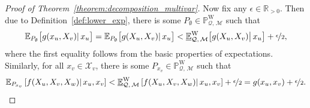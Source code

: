 \documentclass[10pt,a4paper]{paper}
\theoremstyle{definition}
\newcommand{\reals}{\mathbb{R}}
\newcommand{\realspos}{\reals_{>0}}
\newcommand{\states}{\mathcal{X}}
\newcommand{\processes}{\mathbb{P}}
\newcommand{\wprocesses}{\processes^{\mathrm{W}}}
\newcommand{\rateset}{\mathcal{Q}}
\newcommand{\norm}[1]{\left\lVert #1 \right\rVert}
\newcommand{\abs}[1]{\left\vert #1 \right\vert}
\newcommand{\coloneqq}{:\!=}
\begin{document}
\begin{proof}[Proof of Theorem~\ref{theorem:decomposition_multivar}]
\noindent
Now fix any $\epsilon\in\realspos$.
Then due to Definition~\ref{def:lower_exp}, there is some $P_\emptyset\in\wprocesses_{\rateset,\,\mathcal{M}}$ such that
\begin{equation}\label{eq:theorem:decomposition_multivar:firsthalfprob}
\mathbb{E}_{P_\emptyset}\bigl[g(x_u,X_v)\vert\,x_u\bigr]
=\mathbb{E}_{P_\emptyset}\bigl[g(X_u,X_v)\vert\,x_u\bigr] < \underline{\mathbb{E}}^{\mathrm{W}}_{\rateset,\,\mathcal{M}}\bigl[g(X_u,X_v)\big\vert\,x_u\bigr]
+\nicefrac{\epsilon}{2},
\end{equation}
where the first equality follows from the basic properties of expectations. Similarly, for all $x_{v}\in\states_v$, there is some $P_{x_v}\in\wprocesses_{\rateset,\,\mathcal{M}}$ such that
\begin{equation}\label{eq:theorem:decomposition_multivar:secondhalfprob}
\mathbb{E}_{P_{x_v}}\left[f(X_u,X_v,X_w)\vert\,x_u,x_v\right] < \underline{\mathbb{E}}^{\mathrm{W}}_{\rateset,\,\mathcal{M}}\left[f(X_u,X_v,X_w)\vert\,x_u,x_v\right]+\nicefrac{\epsilon}{2}=g(x_u,x_v)+\nicefrac{\epsilon}{2}.
\end{equation}

\end{proof}
\end{document}
